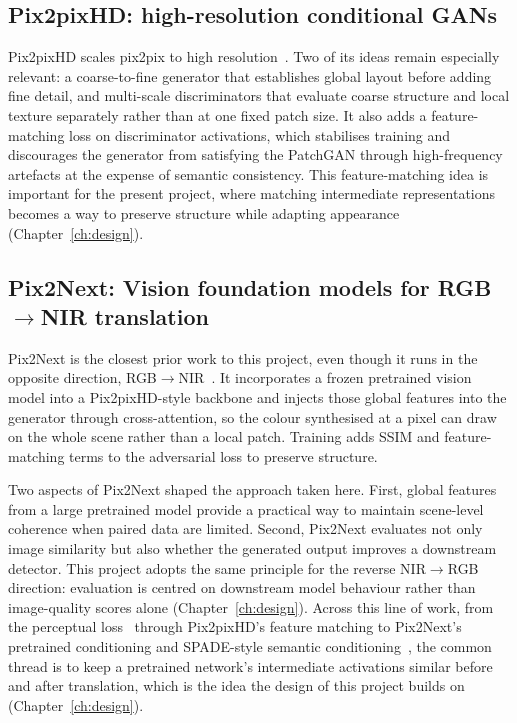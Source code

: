 \subsection{Pix2pixHD: high-resolution conditional GANs}
\label{sec:pix2pixhd}

Pix2pixHD scales pix2pix to high resolution~\cite{wang2018pix2pixhd}. Two of its ideas remain especially relevant: a coarse-to-fine generator that establishes global layout before adding fine detail, and multi-scale discriminators that evaluate coarse structure and local texture separately rather than at one fixed patch size. It also adds a feature-matching loss on discriminator activations, which stabilises training and discourages the generator from satisfying the PatchGAN through high-frequency artefacts at the expense of semantic consistency. This feature-matching idea is important for the present project, where matching intermediate representations becomes a way to preserve structure while adapting appearance (Chapter~\ref{ch:design}).

\subsection{Pix2Next: Vision foundation models for RGB$\rightarrow$NIR translation}
\label{sec:pix2next}

Pix2Next is the closest prior work to this project, even though it runs in the opposite direction, RGB$\rightarrow$NIR~\cite{pix2next2024}. It incorporates a frozen pretrained vision model into a Pix2pixHD-style backbone and injects those global features into the generator through cross-attention, so the colour synthesised at a pixel can draw on the whole scene rather than a local patch. Training adds SSIM and feature-matching terms to the adversarial loss to preserve structure.

Two aspects of Pix2Next shaped the approach taken here. First, global features from a large pretrained model provide a practical way to maintain scene-level coherence when paired data are limited. Second, Pix2Next evaluates not only image similarity but also whether the generated output improves a downstream detector. This project adopts the same principle for the reverse NIR$\rightarrow$RGB direction: evaluation is centred on downstream model behaviour rather than image-quality scores alone (Chapter~\ref{ch:design}). Across this line of work, from the perceptual loss~\cite{johnson2016perceptual} through Pix2pixHD's feature matching to Pix2Next's pretrained conditioning and SPADE-style semantic conditioning~\cite{park2019spade}, the common thread is to keep a pretrained network's intermediate activations similar before and after translation, which is the idea the design of this project builds on (Chapter~\ref{ch:design}).

